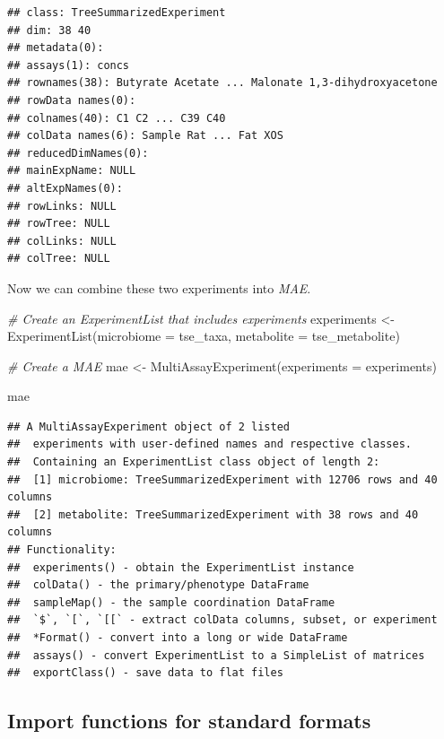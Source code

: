 \documentclass[
]{book}
\newenvironment{Shaded}{\begin{snugshade}}{\end{snugshade}}
\newcommand{\AttributeTok}[1]{\textcolor[rgb]{0.77,0.63,0.00}{#1}}
\newcommand{\CommentTok}[1]{\textcolor[rgb]{0.56,0.35,0.01}{\textit{#1}}}
\newcommand{\FunctionTok}[1]{\textcolor[rgb]{0.00,0.00,0.00}{#1}}
\newcommand{\NormalTok}[1]{#1}
\newcommand{\OtherTok}[1]{\textcolor[rgb]{0.56,0.35,0.01}{#1}}
\begin{document}
\begin{verbatim}
## class: TreeSummarizedExperiment 
## dim: 38 40 
## metadata(0):
## assays(1): concs
## rownames(38): Butyrate Acetate ... Malonate 1,3-dihydroxyacetone
## rowData names(0):
## colnames(40): C1 C2 ... C39 C40
## colData names(6): Sample Rat ... Fat XOS
## reducedDimNames(0):
## mainExpName: NULL
## altExpNames(0):
## rowLinks: NULL
## rowTree: NULL
## colLinks: NULL
## colTree: NULL
\end{verbatim}

Now we can combine these two experiments into \emph{MAE}.

\begin{Shaded}
\begin{Highlighting}[]
\CommentTok{\# Create an ExperimentList that includes experiments}
\NormalTok{experiments }\OtherTok{\textless{}{-}} \FunctionTok{ExperimentList}\NormalTok{(}\AttributeTok{microbiome =}\NormalTok{ tse\_taxa, }
                              \AttributeTok{metabolite =}\NormalTok{ tse\_metabolite)}

\CommentTok{\# Create a MAE}
\NormalTok{mae }\OtherTok{\textless{}{-}} \FunctionTok{MultiAssayExperiment}\NormalTok{(}\AttributeTok{experiments =}\NormalTok{ experiments)}

\NormalTok{mae}
\end{Highlighting}
\end{Shaded}

\begin{verbatim}
## A MultiAssayExperiment object of 2 listed
##  experiments with user-defined names and respective classes.
##  Containing an ExperimentList class object of length 2:
##  [1] microbiome: TreeSummarizedExperiment with 12706 rows and 40 columns
##  [2] metabolite: TreeSummarizedExperiment with 38 rows and 40 columns
## Functionality:
##  experiments() - obtain the ExperimentList instance
##  colData() - the primary/phenotype DataFrame
##  sampleMap() - the sample coordination DataFrame
##  `$`, `[`, `[[` - extract colData columns, subset, or experiment
##  *Format() - convert into a long or wide DataFrame
##  assays() - convert ExperimentList to a SimpleList of matrices
##  exportClass() - save data to flat files
\end{verbatim}

\hypertarget{import-functions-for-standard-formats}{%
\subsection{Import functions for standard formats}\label{import-functions-for-standard-formats}}
\end{document}
